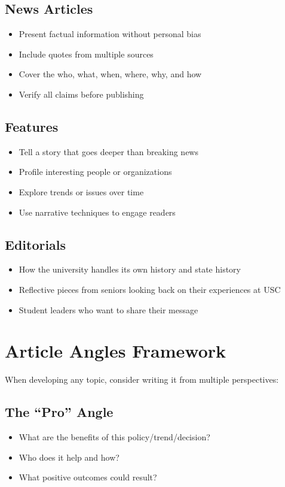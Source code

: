 \documentclass[12pt]{article}
\begin{document}
\subsection*{News Articles}
\begin{itemize}[leftmargin=*]
    \item Present factual information without personal bias
    \item Include quotes from multiple sources
    \item Cover the who, what, when, where, why, and how
    \item Verify all claims before publishing
\end{itemize}

\subsection*{Features}
\begin{itemize}[leftmargin=*]
    \item Tell a story that goes deeper than breaking news
    \item Profile interesting people or organizations
    \item Explore trends or issues over time
    \item Use narrative techniques to engage readers
\end{itemize}

\subsection*{Editorials}
\begin{itemize}[leftmargin=*]
    \item How the university handles its own history and state history
    \item Reflective pieces from seniors looking back on their experiences at USC
    \item Student leaders who want to share their message
\end{itemize}

\section*{Article Angles Framework}

When developing any topic, consider writing it from multiple perspectives:

\subsection*{The ``Pro'' Angle}
\begin{itemize}[leftmargin=*]
    \item What are the benefits of this policy/trend/decision?
    \item Who does it help and how?
    \item What positive outcomes could result?
\end{itemize}
\end{document}
